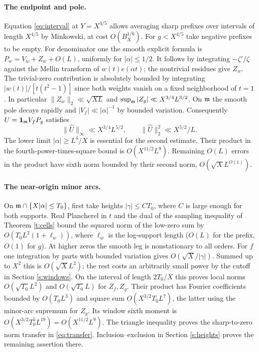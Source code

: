\documentclass[11pt,a4paper]{article}
\begin{document}
\paragraph{The endpoint and pole.}
Equation \eqref{eq:interval} at \(Y=X^{4/5}\) allows averaging sharp prefixes over intervals of length \(X^{4/5}\) by Minkowski, at cost \(O(B_X^{1/6})\). For \(y<X^{4/5}\) take negative prefixes to be empty. For denominator one the smooth explicit formula is \(P_w=V_w+Z_w+O(L)\), uniformly for \(|\alpha|\le1/2\). It follows by integrating \(-\zeta'/\zeta\) against the Mellin transform of \(w(t)e(\alpha t)\); the nontrivial residues give \(Z_w\). The trivial-zero contribution is absolutely bounded by integrating \(|w(t)|/[t(t^2-1)]\) since both weights vanish on a fixed neighborhood of \(t=1\). In particular \(\|Z_w\|_2\ll\sqrt{XL}\) and \(\sup_{{\mathfrak m}}|Z_g|\ll X^{3/4}L^{3/2}\). On \({\mathfrak m}\) the smooth pole decays rapidly and \(|V_f|\ll|\alpha|^{-1}\) by bounded variation. Consequently \(U=\mathbf1_{\mathfrak m} V_f P_g\) satisfies
\[
 \|\widehat U\|_\infty\ll X^{3/4}L^{5/2},\qquad
 \|\widehat U\|_2^2\ll X^{5/2}/L .
\]
The lower limit \(|\alpha|\ge L^4/X\) is essential for the second estimate. Their product in the fourth-power-times-square bound is \(O(X^{11/2}L^9)\). Remaining \(O(L)\) errors in the product have sixth norm bounded by their second norm, \(O(\sqrt X L^{O(1)})\).

\paragraph{The near-origin minor arcs.}
On \({\mathfrak m}\cap\{X|\alpha|\le T_0\}\), first take heights \(|\gamma|\le C T_0\), where \(C\) is large enough for both supports. Real Plancherel in \(t\) and the dual of the sampling inequality of Theorem \ref{t:cells} bound the squared norm of the low-zero sum by \(O(T_0 L^2(1+\ell_w))\), where \(\ell_w\) is the log-support length (\(O(L)\) for the prefix, \(O(1)\) for \(g\)). At higher zeros the smooth leg is nonstationary to all orders. For \(f\) one integration by parts with bounded variation gives \(O(\sqrt X/|\gamma|)\). Summed up to \(X^2\) this is \(O(\sqrt X L^2)\); the rest costs an arbitrarily small power by the cutoff in Section \ref{s:windows}. On the interval of length \(2T_0/X\) this proves local norms \(O(\sqrt{T_0}L^2)\) and \(O(\sqrt{T_0}L)\) for \(Z_f,Z_g\). Their product has Fourier coefficients bounded by \(O(T_0L^3)\) and square sum \(O(X^{3/2}T_0L^7)\), the latter using the minor-arc supremum for \(Z_g\). Its window sixth moment is \(O(X^{3/2}T_0^5L^{19})=O(X^{11/2}L^9)\). The triangle inequality proves the sharp-to-zero norm transfer in \eqref{eq:transfer}. Inclusion--exclusion in Section \ref{s:heights} proves the remaining assertion there.
\end{document}

